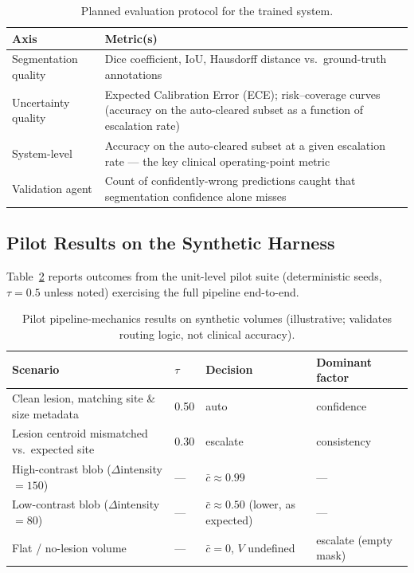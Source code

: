\documentclass[11pt,a4paper]{article}
\begin{document}
\begin{table}[htbp]
\centering
\caption{Planned evaluation protocol for the trained system.}
\label{tab:evalplan}
\small
\begin{tabular}{p{3.2cm}p{9.6cm}}
\toprule
\textbf{Axis} & \textbf{Metric(s)} \\
\midrule
Segmentation quality & Dice coefficient, IoU, Hausdorff distance vs.\ ground-truth annotations \\
Uncertainty quality & Expected Calibration Error (ECE); risk--coverage curves (accuracy on the auto-cleared subset as a function of escalation rate) \\
System-level & Accuracy on the auto-cleared subset at a given escalation rate --- the key clinical operating-point metric \\
Validation agent & Count of confidently-wrong predictions caught that segmentation confidence alone misses \\
\bottomrule
\end{tabular}
\end{table}

\subsection{Pilot Results on the Synthetic Harness}
\label{sec:pilot}
Table~\ref{tab:pilot} reports outcomes from the unit-level pilot suite (deterministic seeds, $\tau=0.5$ unless noted) exercising the full pipeline end-to-end.

\begin{table}[htbp]
\centering
\caption{Pilot pipeline-mechanics results on synthetic volumes (illustrative; validates routing logic, not clinical accuracy).}
\label{tab:pilot}
\small
\begin{tabular}{p{4.3cm}p{2.1cm}p{2.1cm}p{3.3cm}}
\toprule
\textbf{Scenario} & \textbf{$\tau$} & \textbf{Decision} & \textbf{Dominant factor} \\
\midrule
Clean lesion, matching site \& size metadata & 0.50 & auto & confidence \\
Lesion centroid mismatched vs.\ expected site & 0.30 & escalate & consistency \\
High-contrast blob ($\Delta$intensity $=150$) & --- & $\bar c \approx 0.99$ & --- \\
Low-contrast blob ($\Delta$intensity $=80$) & --- & $\bar c \approx 0.50$ (lower, as expected) & --- \\
Flat / no-lesion volume & --- & $\bar c = 0$, $V$ undefined & escalate (empty mask) \\
\bottomrule
\end{tabular}
\end{table}
\end{document}
